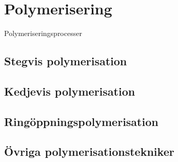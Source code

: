 \section{Polymerisering}

Polymeriseringsprocesser
\subsection{Stegvis polymerisation}
\subsection{Kedjevis polymerisation}
\subsection{Ringöppningspolymerisation}
\subsection{Övriga polymerisationstekniker}
